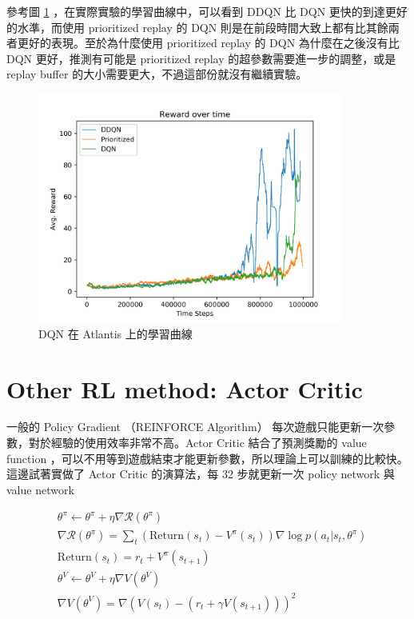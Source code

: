 \documentclass[fleqn,a4paper,12pt]{article}
\begin{document}
參考圖 \ref{fig:learning-curve-dqn-atlantis} ，在實際實驗的學習曲線中，可以看到 DDQN 比 DQN 更快的到達更好的水準，而使用 prioritized replay 的 DQN 則是在前段時間大致上都有比其餘兩者更好的表現。至於為什麼使用 prioritized replay 的 DQN 為什麼在之後沒有比 DQN 更好，推測有可能是 prioritized replay 的超參數需要進一步的調整，或是 replay buffer 的大小需要更大，不過這部份就沒有繼續實驗。

\begin{figure}[h]
  \centering
  \includegraphics[width=0.9\textwidth]{figures/atlantis.png}
  \caption{DQN 在 Atlantis 上的學習曲線}
  \label{fig:learning-curve-dqn-atlantis}
\end{figure}




\section{Other RL method: Actor Critic}

一般的 Policy Gradient （REINFORCE Algorithm） 每次遊戲只能更新一次參數，對於經驗的使用效率非常不高。Actor Critic 結合了預測獎勵的 value function ，可以不用等到遊戲結束才能更新參數，所以理論上可以訓練的比較快。這邊試著實做了 Actor Critic 的演算法，每 32 步就更新一次 policy network 與 value network

\begin{align*}
  & \theta^{\pi} \leftarrow \theta^{\pi} + \eta \nabla \mathcal{R}(\theta^\pi) \\
  & \nabla \mathcal{R}(\theta^\pi) = \sum_t (\mathrm{Return}(s_t) - V^\pi(s_t)) \nabla \log p(a_t | s_t, \theta^\pi) \\
  & \mathrm{Return}(s_t) = r_t + V^\pi(s_{t+1}) \\
  & \theta^{V} \leftarrow \theta^{V} + \eta \nabla V(\theta^V) \\
  & \nabla V(\theta^V) = \nabla (V(s_t) - (r_t + \gamma V(s_{t+1})))^2 
\end{align*}
\end{document}
